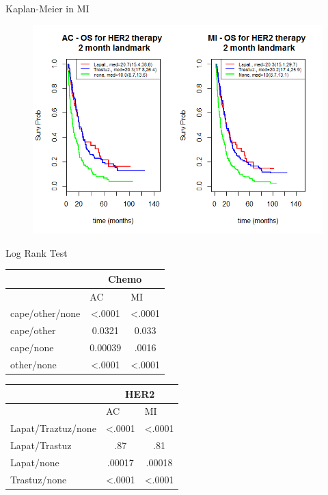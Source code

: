\begin{frame}{Kaplan-Meier in MI}
 \begin{figure}[h!]
  \centering
\includegraphics[width=.8\textwidth]{lapat_km}
\end{figure}
 
\end{frame}

\begin{frame}{Log Rank Test}
\begin{table}[]
\centering
\begin{tabular}{|l|c|c|}
\hline
                & \multicolumn{2}{c|}{Chemo}                         \\ \hline
                & \multicolumn{1}{l|}{AC} & \multicolumn{1}{l|}{MI} \\ \hline
cape/other/none & \textless.0001          & \textless.0001          \\ \hline
cape/other      & 0.0321                  & 0.033                   \\ \hline
cape/none       & 0.00039                 & .0016                   \\ \hline
other/none      & \textless.0001          & \textless.0001          \\ \hline
\end{tabular}
\end{table}
%
\begin{table}[]
\centering
\begin{tabular}{|l|c|c|}
\hline
                   & \multicolumn{2}{c|}{HER2}                         \\ \hline
                   & \multicolumn{1}{l|}{AC} & \multicolumn{1}{l|}{MI} \\ \hline
Lapat/Traztuz/none & \textless.0001          & \textless.0001          \\ \hline
Lapat/Trastuz      & .87                     & .81                     \\ \hline
Lapat/none         & .00017                  & .00018                  \\ \hline
Trastuz/none       & \textless.0001          & \textless.0001          \\ \hline
\end{tabular}
\end{table}
\end{frame}

